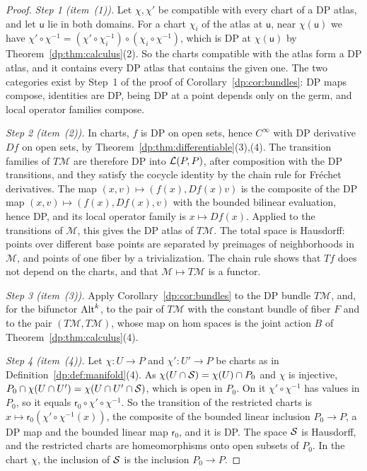 \begin{proof}
\emph{Step 1 (item~(1)).} Let $\chi,\chi'$ be compatible with every chart of a DP atlas, and let $\mathsf u$ lie in both domains. For a chart $\chi_i$ of the atlas at $\mathsf u$, near $\chi(\mathsf u)$ we have $\chi'\circ\chi^{-1}=(\chi'\circ\chi_i^{-1})\circ(\chi_i\circ\chi^{-1})$, which is DP at $\chi(\mathsf u)$ by Theorem~\ref{dp:thm:calculus}(2). So the charts compatible with the atlas form a DP atlas, and it contains every DP atlas that contains the given one. The two categories exist by Step~1 of the proof of Corollary~\ref{dp:cor:bundles}: DP maps compose, identities are DP, being DP at a point depends only on the germ, and local operator families compose.

\emph{Step 2 (item~(2)).} In charts, $f$ is DP on open sets, hence $C^\infty$ with DP derivative $Df$ on open sets, by Theorem~\ref{dp:thm:differentiable}(3),(4). The transition families of $T\mathcal M$ are therefore DP into $\mathcal L(P,P)$, after composition with the DP transitions, and they satisfy the cocycle identity by the chain rule for Fr\'echet derivatives. The map $(x,v)\mapsto(f(x),Df(x)v)$ is the composite of the DP map $(x,v)\mapsto(f(x),Df(x),v)$ with the bounded bilinear evaluation, hence DP, and its local operator family is $x\mapsto Df(x)$. Applied to the transitions of $\mathcal M$, this gives the DP atlas of $T\mathcal M$. The total space is Hausdorff: points over different base points are separated by preimages of neighborhoods in $\mathcal M$, and points of one fiber by a trivialization. The chain rule shows that $Tf$ does not depend on the charts, and that $\mathcal M\mapsto T\mathcal M$ is a functor.

\emph{Step 3 (item~(3)).} Apply Corollary~\ref{dp:cor:bundles} to the DP bundle $T\mathcal M$, and, for the bifunctor $\operatorname{Alt}^k$, to the pair of $T\mathcal M$ with the constant bundle of fiber $F$ and to the pair $(T\mathcal M,T\mathcal M)$, whose map on hom spaces is the joint action $B$ of Theorem~\ref{dp:thm:calculus}(4).

\emph{Step 4 (item~(4)).} Let $\chi\colon U\to P$ and $\chi'\colon U'\to P$ be charts as in Definition~\ref{dp:def:manifold}(4). As $\chi(U\cap\mathcal S)=\chi(U)\cap P_0$ and $\chi$ is injective, $P_0\cap\chi(U\cap U')=\chi(U\cap U'\cap\mathcal S)$, which is open in $P_0$. On it $\chi'\circ\chi^{-1}$ has values in $P_0$, so it equals $\mathsf r_0\circ\chi'\circ\chi^{-1}$. So the transition of the restricted charts is $x\mapsto\mathsf r_0(\chi'\circ\chi^{-1}(x))$, the composite of the bounded linear inclusion $P_0\to P$, a DP map and the bounded linear map $\mathsf r_0$, and it is DP. The space $\mathcal S$ is Hausdorff, and the restricted charts are homeomorphisms onto open subsets of $P_0$. In the chart $\chi$, the inclusion of $\mathcal S$ is the inclusion $P_0\to P$.
\end{proof}
